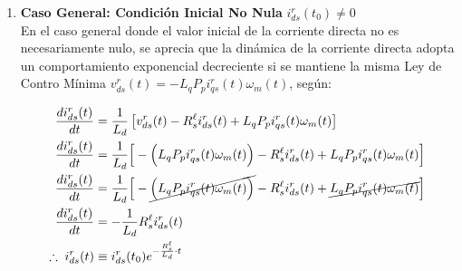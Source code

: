 \documentclass[blue,fullpaper]{ludusofficial}  %
\begin{document}
\begin{enumerate}
    Luego, de analizarse la dinámica de la corriente en cuadratura $i_{qs}^{r}(t)$, donde se puede apreciar que existe acoplamiento con la corriente directa $i_{ds}^{r}(t)$, y que al aplicar la Ley de Control Mínima se modifica según:

    \begin{equation*}
        \frac{di_{qs}^{r}(t)}{dt} = \frac{1}{L_{q} } \left[ v_{qs}^{r}(t) - R_{s}^{\ell} i_{qs}^{r}(t) - \big[ \lambda_{m}^{'r} +\cancel{  L_{d} i_{ds}^{r}(t) } \big] \omega_{m}(t)P_{p} \right]
    \end{equation*}

    Por lo que permite un desacople entre las corrientes directa y en cuadratura, linealizando la dinámica de la corriente en cuadratura $i_{qs}^{r}(t)$. Esta forma de linealización no es debido a que se introduce un término que cancele la expresión lineal, sino de que el término no lineal fue anulado a partir de su ecuación dinámica.
    
    La expresión resultante será:

    \begin{equation}
\label{eq:dinamica-iq-lineal}
        \frac{di_{qs}^{r}(t)}{dt} = \frac{1}{L_{q} } \left[ v_{qs}^{r}(t) - R_{s}^{\ell} i_{qs}^{r}(t) -\lambda_{m}^{'r} P_{p} \omega_{m}(t) \right]
    \end{equation}

    Con la misma Ley de Control Mínima, se linealiza tanto la dinámica de la corriente directa como la dinámica de la corriente en cuadratura, siempre y cuando el valor inicial de la corriente directa sea nulo $i_{ds}^{r}(t_0) = 0$.

    \item \textbf{Caso General: Condición Inicial No Nula} $i_{ds}^{r}(t_0) \neq 0$ \\
    En el caso general donde el valor inicial de la corriente directa no es necesariamente nulo, se aprecia que la dinámica de la corriente directa adopta un comportamiento exponencial decreciente si se mantiene la misma Ley de Contro Mínima $v_{ds}^{r}(t)  = -L_{q}P_{p} i_{qs}^{r}(t) \omega_{m}(t)$, según:
    
    \begin{align*}
    \frac{di_{ds}^{r}(t)}{dt} & = \frac{1}{L_{d}} \left[v_{ds}^{r}(t) - R_{s}^{\ell} i_{ds}^{r}(t) + L_{q}P_{p} i_{qs}^{r}(t) \omega_{m}(t) \right]
    \\
    \frac{di_{ds}^{r}(t)}{dt} & = \frac{1}{L_{d}} \Big[ - \Big(  L_{q}P_{p} i_{qs}^{r}(t) \omega_{m}(t) \Big) - R_{s}^{\ell} i_{ds}^{r}(t) + L_{q}P_{p} i_{qs}^{r}(t) \omega_{m}(t) \Big]
    \\
    \frac{di_{ds}^{r}(t)}{dt} & = \frac{1}{L_{d}} \Big[ - \cancel{ \Big(  L_{q}P_{p} i_{qs}^{r}(t) \omega_{m}(t) \Big) } - R_{s}^{\ell} i_{ds}^{r}(t) + \cancel{ L_{q}P_{p} i_{qs}^{r}(t) \omega_{m}(t)  }\Big]  \\
    \frac{di_{ds}^{r}(t)}{dt} & = -\frac{1}{L_{d}} R_{s}^{\ell} i_{ds}^{r}(t) \\
     \therefore \; i_{ds}^{r}(t)  & \equiv i_{ds}^{r}(t_0) e^{ -\frac{ R_{s}^{\ell} }{L_{d}} \cdot t  }
    \end{align*}


\end{enumerate}
\end{document}
